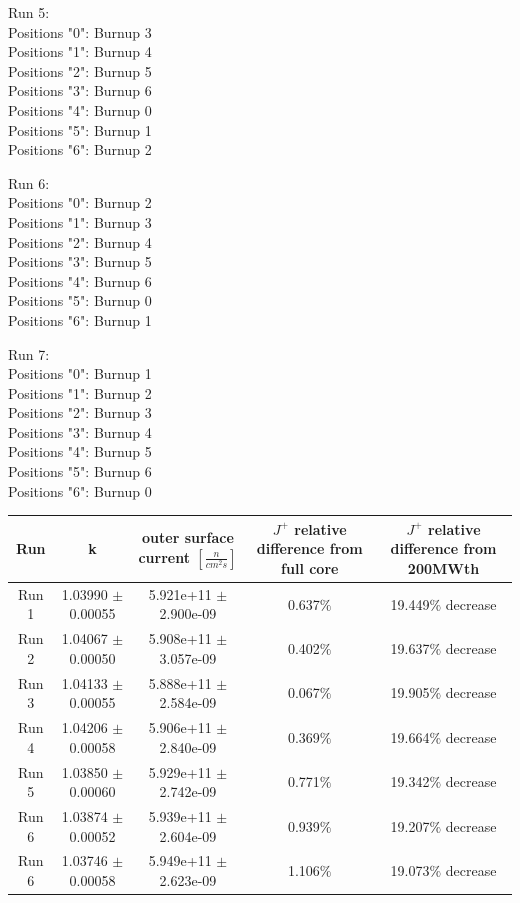 \documentclass[letterpaper]{article}
\begin{document}
\begin{center}
Run 5:\\
Positions "0": Burnup 3\\
Positions "1": Burnup 4\\
Positions "2": Burnup 5\\
Positions "3": Burnup 6\\
Positions "4": Burnup 0\\
Positions "5": Burnup 1\\
Positions "6": Burnup 2\\
\end{center}
\begin{center}
Run 6:\\
Positions "0": Burnup 2\\
Positions "1": Burnup 3\\
Positions "2": Burnup 4\\
Positions "3": Burnup 5\\
Positions "4": Burnup 6\\
Positions "5": Burnup 0\\
Positions "6": Burnup 1\\
\end{center}
\begin{center}
Run 7:\\
Positions "0": Burnup 1\\
Positions "1": Burnup 2\\
Positions "2": Burnup 3\\
Positions "3": Burnup 4\\
Positions "4": Burnup 5\\
Positions "5": Burnup 6\\
Positions "6": Burnup 0\\
\end{center}

\begin{adjustbox}{max width=\textwidth}
\centering
 \begin{tabular}{|c | c | c | c | c|}
 	\hline \hline
 	Run & k & outer surface current $[\frac{n}{cm^2s}]$ & $J^+$ relative difference from full core & $J^+$ relative difference from 200MWth \\
 	\hline\hline
 	Run 1 & 1.03990 $\pm$ 0.00055 & 5.921e+11 $\pm$ 2.900e-09 & 0.637$\%$ & 19.449$\%$ decrease \\
 	Run 2 & 1.04067 $\pm$ 0.00050 & 5.908e+11 $\pm$ 3.057e-09 & 0.402$\%$ & 19.637$\%$ decrease \\
 	Run 3 & 1.04133 $\pm$ 0.00055 & 5.888e+11 $\pm$ 2.584e-09 & 0.067$\%$ & 19.905$\%$ decrease \\
 	Run 4 & 1.04206 $\pm$ 0.00058 & 5.906e+11 $\pm$ 2.840e-09 & 0.369$\%$ & 19.664$\%$ decrease \\
 	Run 5 & 1.03850 $\pm$ 0.00060 & 5.929e+11 $\pm$ 2.742e-09 & 0.771$\%$ & 19.342$\%$ decrease \\
 	Run 6 & 1.03874 $\pm$ 0.00052 & 5.939e+11 $\pm$ 2.604e-09 & 0.939$\%$ & 19.207$\%$ decrease \\
 	Run 6 & 1.03746 $\pm$ 0.00058 & 5.949e+11 $\pm$ 2.623e-09 & 1.106$\%$ & 19.073$\%$ decrease \\
 	\hline


 \end{tabular}
\end{adjustbox}
\end{document}

